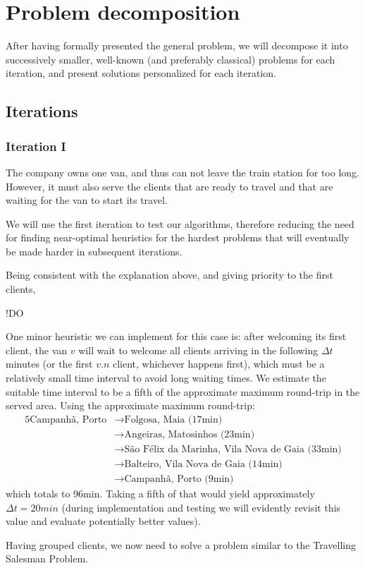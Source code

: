 \chapter{Problem decomposition} \label{problem-decomposition}
After having formally presented the general problem, we will decompose it into successively smaller, well-known (and preferably classical) problems for each iteration, and present solutions personalized for each iteration.

\section{Iterations} \label{problem-decomposition-iterations}
\subsection{Iteration I}
The company owns one van, and thus can not leave the train station for too long. However, it must also serve the clients that are ready to travel and that are waiting for the van to start its travel.\par
We will use the first iteration to test our algorithms, therefore reducing the need for finding near-optimal heuristics for the hardest problems that will eventually be made harder in subsequent iterations.\par
Being consistent with the explanation above, and giving priority to the first clients,\par
!DO
\par
One minor heuristic we can implement for this case is: after welcoming its first client, the van $v$ will wait to welcome all clients arriving in the following $\Delta t$ minutes (or the first $v.n$ client, whichever happens first), which must be a relatively small time interval to avoid long waiting times. We estimate the suitable time interval to be a fifth of the approximate maximum round-trip in the served area. Using the approximate maximum round-trip:
\begin{alignat*}{5}
    \text{Campanhã, Porto}
    &\rightarrow \text{Folgosa, Maia (17min)} \\
    &\rightarrow\text{Angeiras, Matosinhos (23min)} \\
    &\rightarrow\text{São Félix da Marinha, Vila Nova de Gaia (33min)} \\
    &\rightarrow\text{Balteiro, Vila Nova de Gaia (14min)} \\
    &\rightarrow\text{Campanhã, Porto (9min)}
\end{alignat*}
which totals to 96min. Taking a fifth of that would yield approximately $\Delta t = 20min$ (during implementation and testing we will evidently revisit this value and evaluate potentially better values).\par
Having grouped clients, we now need to solve a problem similar to the Travelling Salesman Problem.

